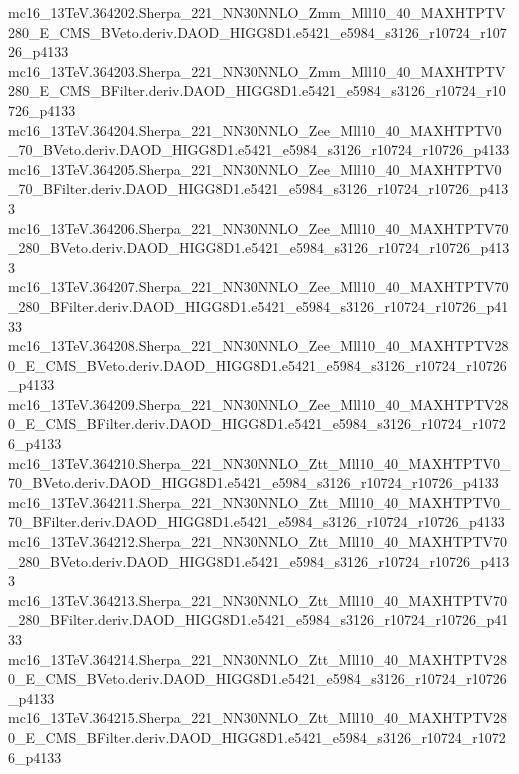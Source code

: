 \begin{scriptsize}
mc16\_13TeV.364202.Sherpa\_221\_NN30NNLO\_Zmm\_Mll10\_40\_MAXHTPTV280\_E\_CMS\_BVeto.deriv.DAOD\_HIGG8D1.e5421\_e5984\_s3126\_r10724\_r10726\_p4133 \\
mc16\_13TeV.364203.Sherpa\_221\_NN30NNLO\_Zmm\_Mll10\_40\_MAXHTPTV280\_E\_CMS\_BFilter.deriv.DAOD\_HIGG8D1.e5421\_e5984\_s3126\_r10724\_r10726\_p4133 \\
mc16\_13TeV.364204.Sherpa\_221\_NN30NNLO\_Zee\_Mll10\_40\_MAXHTPTV0\_70\_BVeto.deriv.DAOD\_HIGG8D1.e5421\_e5984\_s3126\_r10724\_r10726\_p4133 \\
mc16\_13TeV.364205.Sherpa\_221\_NN30NNLO\_Zee\_Mll10\_40\_MAXHTPTV0\_70\_BFilter.deriv.DAOD\_HIGG8D1.e5421\_e5984\_s3126\_r10724\_r10726\_p4133 \\
mc16\_13TeV.364206.Sherpa\_221\_NN30NNLO\_Zee\_Mll10\_40\_MAXHTPTV70\_280\_BVeto.deriv.DAOD\_HIGG8D1.e5421\_e5984\_s3126\_r10724\_r10726\_p4133 \\
mc16\_13TeV.364207.Sherpa\_221\_NN30NNLO\_Zee\_Mll10\_40\_MAXHTPTV70\_280\_BFilter.deriv.DAOD\_HIGG8D1.e5421\_e5984\_s3126\_r10724\_r10726\_p4133 \\
mc16\_13TeV.364208.Sherpa\_221\_NN30NNLO\_Zee\_Mll10\_40\_MAXHTPTV280\_E\_CMS\_BVeto.deriv.DAOD\_HIGG8D1.e5421\_e5984\_s3126\_r10724\_r10726\_p4133 \\
mc16\_13TeV.364209.Sherpa\_221\_NN30NNLO\_Zee\_Mll10\_40\_MAXHTPTV280\_E\_CMS\_BFilter.deriv.DAOD\_HIGG8D1.e5421\_e5984\_s3126\_r10724\_r10726\_p4133 \\
mc16\_13TeV.364210.Sherpa\_221\_NN30NNLO\_Ztt\_Mll10\_40\_MAXHTPTV0\_70\_BVeto.deriv.DAOD\_HIGG8D1.e5421\_e5984\_s3126\_r10724\_r10726\_p4133 \\
mc16\_13TeV.364211.Sherpa\_221\_NN30NNLO\_Ztt\_Mll10\_40\_MAXHTPTV0\_70\_BFilter.deriv.DAOD\_HIGG8D1.e5421\_e5984\_s3126\_r10724\_r10726\_p4133 \\
mc16\_13TeV.364212.Sherpa\_221\_NN30NNLO\_Ztt\_Mll10\_40\_MAXHTPTV70\_280\_BVeto.deriv.DAOD\_HIGG8D1.e5421\_e5984\_s3126\_r10724\_r10726\_p4133 \\
mc16\_13TeV.364213.Sherpa\_221\_NN30NNLO\_Ztt\_Mll10\_40\_MAXHTPTV70\_280\_BFilter.deriv.DAOD\_HIGG8D1.e5421\_e5984\_s3126\_r10724\_r10726\_p4133 \\
mc16\_13TeV.364214.Sherpa\_221\_NN30NNLO\_Ztt\_Mll10\_40\_MAXHTPTV280\_E\_CMS\_BVeto.deriv.DAOD\_HIGG8D1.e5421\_e5984\_s3126\_r10724\_r10726\_p4133 \\
mc16\_13TeV.364215.Sherpa\_221\_NN30NNLO\_Ztt\_Mll10\_40\_MAXHTPTV280\_E\_CMS\_BFilter.deriv.DAOD\_HIGG8D1.e5421\_e5984\_s3126\_r10724\_r10726\_p4133 \\

\end{scriptsize}

